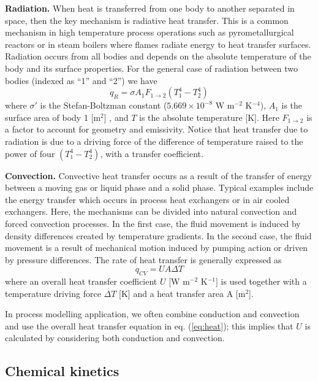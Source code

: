 \documentclass[a4paper,11pt]{article}
\theoremstyle{definition}
\begin{document}
\textbf{Radiation.} When heat is transferred from one body to another separated in space, then the key
mechanism is radiative heat transfer. This is a common mechanism in high temperature
process operations such as pyrometallurgical reactors or in steam boilers where flames
radiate energy to heat transfer surfaces. Radiation occurs from all bodies and depends
on the absolute temperature of the body and its surface properties.
For the general case of radiation between two bodies (indexed as ``1'' and ``2'') we have
\begin{equation}
	q_{R} = \sigma A_1 F_{1 \to 2} (T_1^4 - T_2^4)
\end{equation}
\noindent where $\sigma'$ is the Stefan-Boltzman constant ($5.669 \times 10^{-8} $ W m$^{-2}$ K$^{-4}$), 
$A_1$ is the surface area of body 1 [m$^2$] , and $T$ is the absolute temperature [K].
Here $F_{1 \to 2}$ is a factor to account for geometry and emissivity.
Notice that heat transfer due to radiation is due to a driving force of the difference of
temperature raised to the power of four $(T_1^4 - T_2^4)$, with a transfer coefficient.

\textbf{Convection.} Convective heat transfer occurs as a result of the transfer of energy between a moving
gas or liquid phase and a solid phase. Typical examples include the energy transfer
which occurs in process heat exchangers or in air cooled exchangers. Here, the mechanisms can be divided into natural convection and forced convection processes. In
the first case, the fluid movement is induced by density differences created by temperature gradients. In the second case, the fluid movement is a result of mechanical
motion induced by pumping action or driven by pressure differences. The rate of heat
transfer is generally expressed as
\begin{equation} \label{eq:heat}
	q_{CV} = U A \Delta T
\end{equation}
\noindent where an overall heat transfer coefficient $U$ [W m$^{-2}$ K$^{-1}$] is used together 
with a temperature driving force $\Delta T$ [K] and a heat transfer area A [m$^2$]. 

In process modelling application, we often combine conduction and convection and use the overall
heat transfer equation in eq. (\ref{eq:heat}); this implies that $U$ is calculated by considering both conduction and convection.


\subsection{Chemical kinetics}
\end{document}
